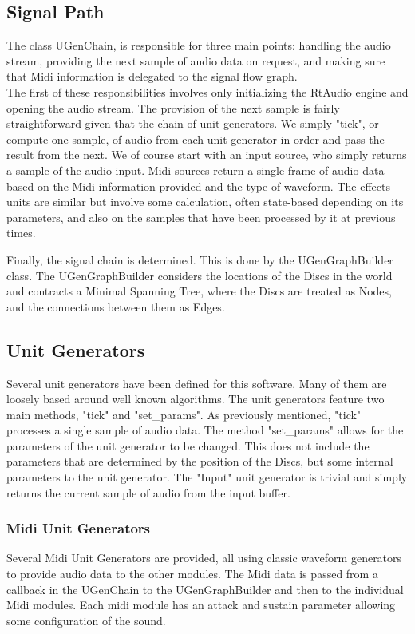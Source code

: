 \documentclass[pdftext,twoside,10pt]{article}
\begin{document}
\subsection{Signal Path}
The class UGenChain, is responsible for three main points: handling the audio stream, providing the next sample of audio data on request, and making sure that Midi information is delegated to the signal flow graph.\\
The first of these responsibilities involves only initializing the RtAudio engine and opening the audio stream. The provision of the next sample is fairly straightforward given that the chain of unit generators. We simply "tick", or compute one sample, of audio from each unit generator in order and pass the result from the next. We of course start with an input source, who simply returns a sample of the audio input. Midi sources return a single frame of audio data based on the Midi information provided and the type of waveform. The effects units are similar but involve some calculation, often state-based depending on its parameters, and also on the samples that have been processed by it at previous times.

Finally, the signal chain is determined. This is done by the UGenGraphBuilder class. The UGenGraphBuilder considers the locations of the Discs in the world and contracts a Minimal Spanning Tree, where the Discs are treated as Nodes, and the connections between them as Edges.

\subsection{Unit Generators}
Several unit generators have been defined for this software. Many of them are loosely based around well known algorithms. The unit generators feature two main methods, "tick" and "set\_params". As previously mentioned, "tick" processes a single sample of audio data. The method "set\_params" allows for the parameters of the unit generator to be changed. This does not include the parameters that are determined by the position of the Discs, but some internal parameters to the unit generator. The "Input" unit generator is trivial and simply returns the current sample of audio from the input buffer.

\subsubsection*{Midi Unit Generators} Several Midi Unit Generators are provided, all using classic waveform generators to provide audio data to the other modules. The Midi data is passed from a callback in the UGenChain to the UGenGraphBuilder and then to the individual Midi modules. Each midi module has an attack and sustain parameter allowing some configuration of the sound.
\end{document}
